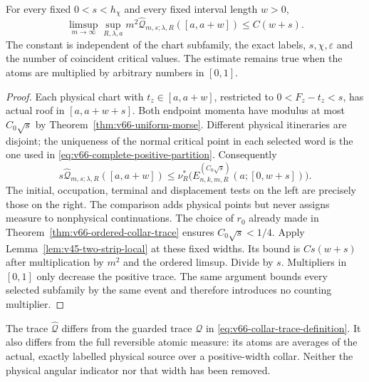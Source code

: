 \begin{theorem}
\label{thm:v69-comparison-collar}
For every fixed $0<s<h_\chi$ and every fixed interval length $w>0$,
\begin{equation}\label{eq:v69-comparison-collar}
 \limsup_{m\to\infty}\sup_{R,\lambda,a}m^2
       \widehat{\mathcal Q}_{m,s;\lambda,R}([a,a+w])
                       \le C(w+s).
\end{equation}
The constant is independent of the chart subfamily, the exact labels,
$s,\chi,\varepsilon$ and the number of coincident critical values.
The estimate remains true when the atoms are multiplied by arbitrary
numbers in $[0,1]$.
\end{theorem}
\begin{proof}
Each physical chart with $t_z\in[a,a+w]$, restricted to
$0<F_z-t_z<s$, has actual roof in $[a,a+w+s]$. Both endpoint
momenta have modulus at most $C_0\sqrt s$ by
Theorem~\ref{thm:v66-uniform-morse}. Different physical itineraries
are disjoint; the uniqueness of the normal critical point in each
selected word is the one used in
\eqref{eq:v66-complete-positive-partition}. Consequently
\[
 s\widehat{\mathcal Q}_{m,s;\lambda,R}([a,a+w])
 \le\nu_R^*\bigl(E^{(C_0\sqrt s)}_{n,k,m,R}
                                     (a;[0,w+s])\bigr).
\]
The initial, occupation, terminal and displacement tests on the left
are precisely those on the right. The comparison adds physical
points but never assigns measure to nonphysical continuations.
The choice of $r_0$ already made in
Theorem~\ref{thm:v66-ordered-collar-trace} ensures
$C_0\sqrt s<1/4$. Apply
Lemma~\ref{lem:v45-two-strip-local} at these fixed widths. Its
bound is $Cs(w+s)$ after multiplication by $m^2$ and the ordered
limsup. Divide by $s$. Multipliers in $[0,1]$ only decrease the
positive trace. The same argument bounds every selected subfamily
by the same event and therefore introduces no counting multiplier.
\end{proof}

The trace $\widehat{\mathcal Q}$ differs from the guarded trace
$\mathcal Q$ in \eqref{eq:v66-collar-trace-definition}. It also
differs from the full reversible atomic measure: its atoms are
averages of the actual, exactly labelled physical source over a
positive-width collar. Neither the physical angular indicator nor
that width has been removed.
